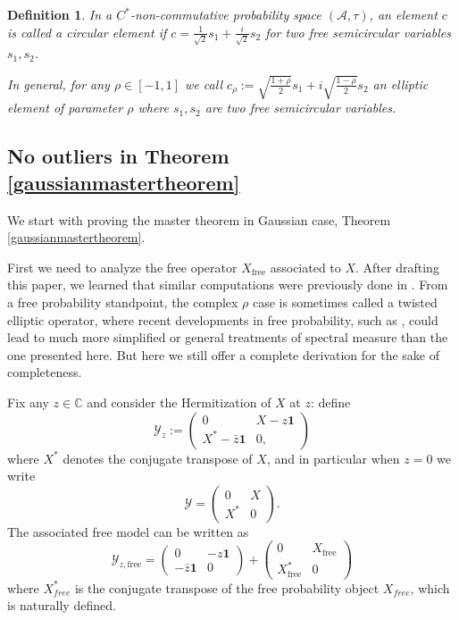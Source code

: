 \documentclass[11pt,reqno]{amsart}
\theoremstyle{plain}
\newtheorem{Definition}[theorem]{Definition}
\theoremstyle{remark}
\numberwithin{equation}{section}
\begin{document}
\begin{Definition}
    In a $C^*$-non-commutative probability space $(\mathcal{A},\tau)$, an element $c$ is called a circular element if $c=\frac{1}{\sqrt{2}}s_1+\frac{i}{\sqrt{2}}s_2$ for two free semicircular variables $s_1,s_2$. 
    
    
    
    In general, for any $\rho\in[-1,1]$ we call $c_\rho:=\sqrt{\frac{1+\rho}{2}}s_1+i\sqrt{\frac{1-\rho}{2}}s_2$ an elliptic element of parameter $\rho$ where $s_1,s_2$ are two free semicircular variables.
\end{Definition}


\subsection{No outliers in Theorem \ref{gaussianmastertheorem}}  
We start with proving the master theorem in Gaussian case, Theorem \ref{gaussianmastertheorem}. 


First we need to analyze the free operator $X_{\text{free}}$ associated to $X$. After drafting this paper, we learned that similar computations were previously done in \cite{erdHos2023randomly}. From a free probability standpoint, the complex $\rho$ case is sometimes called a twisted elliptic operator, where recent developments in free probability, such as  \cite{belinschi2024brown}, could lead to much more simplified or general treatments of spectral measure than the one presented here.
But here we still offer a complete derivation for the sake of completeness.

Fix any $z\in\mathbb{C}$ and consider the Hermitization of $X$ at $z$: define
$$
\mathcal{Y}_z:=\begin{pmatrix}
    0& X-z\mathbf{1}\\{X}^*-\bar{z}\mathbf{1}&0,
\end{pmatrix} 
$$ where $X^*$ denotes the conjugate transpose of $X$, and in particular when $z=0$ we write 
$$
\mathcal{Y}=\begin{pmatrix}
    0&X\\X^*&0
\end{pmatrix}.
$$
The associated free model can be written as 
$$
\mathcal{Y}_{z,\text{free}}=\begin{pmatrix}
    0& -z\mathbf{1}\\-\bar{z}\mathbf{1}&0\end{pmatrix}+\begin{pmatrix}
    0& X_{\text{free}}\\X^*_{\text{free}}&0\end{pmatrix}
$$  where $X^*_{free}$ is the conjugate transpose of the free probability object $X_{free}$, which is naturally defined.
\end{document}
